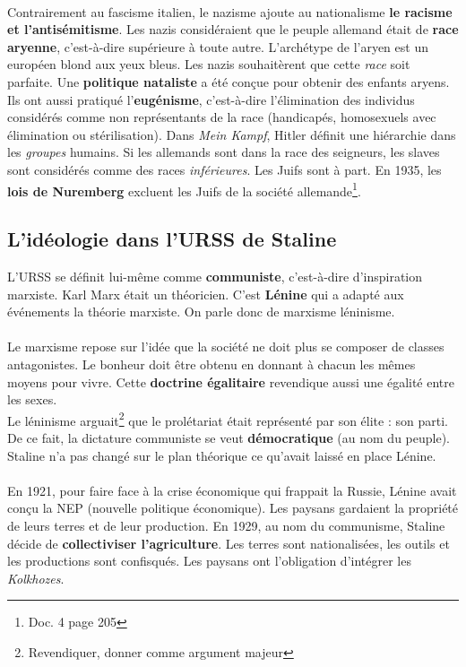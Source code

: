 \documentclass[12pt]{article}
\renewcommand{\emph}{\textbf}
\begin{document}
\paragraph{}
Contrairement au fascisme italien, le nazisme ajoute au nationalisme \emph{le racisme et l'antisémitisme}. Les nazis considéraient que le peuple allemand était de \emph{race aryenne}, c'est-à-dire supérieure à toute autre. L'archétype de l'aryen est un européen blond aux yeux bleus. Les nazis souhaitèrent que cette \textit{race} soit parfaite. Une \emph{politique nataliste} a été conçue pour obtenir des enfants aryens. Ils ont aussi pratiqué l'\emph{eugénisme}, c'est-à-dire l'élimination des individus considérés comme non représentants de la race (handicapés, homosexuels avec élimination ou stérilisation). Dans \textit{Mein Kampf}, Hitler définit une hiérarchie dans les \textit{groupes} humains. Si les allemands sont dans la race des seigneurs, les slaves sont considérés comme des races \textit{inférieures}. Les Juifs sont à part. En 1935, les \emph{lois de Nuremberg} excluent les Juifs de la société allemande\footnote{Doc. 4 page 205}.

\subsection{L'idéologie dans l'URSS de Staline}

L'URSS se définit lui-même comme \emph{communiste}, c'est-à-dire d'inspiration marxiste. Karl Marx était un théoricien. C'est \emph{Lénine} qui a adapté aux événements la théorie marxiste. On parle donc de marxisme léninisme.

\paragraph{}
Le marxisme repose sur l'idée que la société ne doit plus se composer de classes antagonistes. Le bonheur doit être obtenu en donnant à chacun les mêmes moyens pour vivre. Cette \emph{doctrine égalitaire} revendique aussi une égalité entre les sexes.\\
Le léninisme arguait\footnote{Revendiquer, donner comme argument majeur}  que le prolétariat était représenté par son élite : son parti. De ce fait, la dictature communiste se veut \emph{démocratique} (au nom du peuple). Staline n'a pas changé sur le plan théorique ce qu'avait laissé en place Lénine.

\paragraph{}
En 1921, pour faire face à la crise économique qui frappait la Russie, Lénine avait conçu la NEP (nouvelle politique économique). Les paysans gardaient la propriété de leurs terres et de leur production. En 1929, au nom du communisme, Staline décide de \emph{collectiviser l'agriculture}. Les terres sont nationalisées, les outils et les productions sont confisqués. Les paysans ont l'obligation d'intégrer les \textit{Kolkhozes}.
\end{document}
